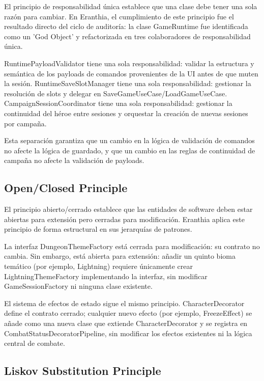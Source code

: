 \documentclass[stu,12pt,floatsintext]{apa7}
\begin{document}
El principio de responsabilidad única establece que una clase debe tener una sola razón para cambiar. En Eranthia, el cumplimiento de este principio fue el resultado directo del ciclo de auditoría: la clase GameRuntime fue identificada como un 'God Object' y refactorizada en tres colaboradores de responsabilidad única.

RuntimePayloadValidator tiene una sola responsabilidad: validar la estructura y semántica de los payloads de comandos provenientes de la UI antes de que muten la sesión. RuntimeSaveSlotManager tiene una sola responsabilidad: gestionar la resolución de slots y delegar en SaveGameUseCase/LoadGameUseCase. CampaignSessionCoordinator tiene una sola responsabilidad: gestionar la continuidad del héroe entre sesiones y orquestar la creación de nuevas sesiones por campaña.

Esta separación garantiza que un cambio en la lógica de validación de comandos no afecte la lógica de guardado, y que un cambio en las reglas de continuidad de campaña no afecte la validación de payloads.

\subsection{Open/Closed Principle}

El principio abierto/cerrado establece que las entidades de software deben estar abiertas para extensión pero cerradas para modificación. Eranthia aplica este principio de forma estructural en sus jerarquías de patrones.

La interfaz DungeonThemeFactory está cerrada para modificación: su contrato no cambia. Sin embargo, está abierta para extensión: añadir un quinto bioma temático (por ejemplo, Lightning) requiere únicamente crear LightningThemeFactory implementando la interfaz, sin modificar GameSessionFactory ni ninguna clase existente.

El sistema de efectos de estado sigue el mismo principio. CharacterDecorator define el contrato cerrado; cualquier nuevo efecto (por ejemplo, FreezeEffect) se añade como una nueva clase que extiende CharacterDecorator y se registra en CombatStatusDecoratorPipeline, sin modificar los efectos existentes ni la lógica central de combate.

\subsection{Liskov Substitution Principle}
\end{document}
